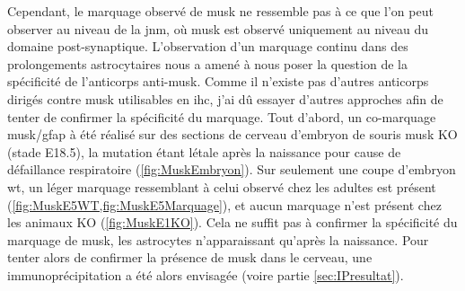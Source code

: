 	Cependant, le marquage observé de \gls{musk} ne ressemble pas à ce que l'on peut observer au niveau de la \gls{jnm}, où \gls{musk} est observé uniquement au niveau du domaine post-synaptique. L'observation d'un marquage continu dans des prolongements astrocytaires nous a amené à nous poser la question de la spécificité de l'anticorps anti-\gls{musk}. Comme il n'existe pas d'autres anticorps dirigés contre \gls{musk} utilisables en \gls{ihc}, j'ai dû essayer d'autres approches afin de tenter de confirmer la spécificité du marquage. Tout d'abord, un co-marquage \gls{musk}/\acrshort{gfap} à été réalisé sur des sections de cerveau d'embryon de souris \gls{musk} KO (stade E18.5), la mutation étant létale après la naissance pour cause de défaillance respiratoire (\cref{fig:MuskEmbryon}). Sur seulement une coupe d'embryon \gls{wt}, un léger marquage ressemblant à celui observé chez les adultes est présent (\cref{fig:MuskE5WT,fig:MuskE5Marquage}), et aucun marquage n'est présent chez les animaux KO (\cref{fig:MuskE1KO}). Cela ne suffit pas à confirmer la spécificité du marquage de \gls{musk}, les astrocytes n'apparaissant qu'après la naissance. Pour tenter alors de confirmer la présence de \gls{musk} dans le cerveau, une immunoprécipitation a été alors envisagée (voire partie \cref{sec:IPresultat}).
	
